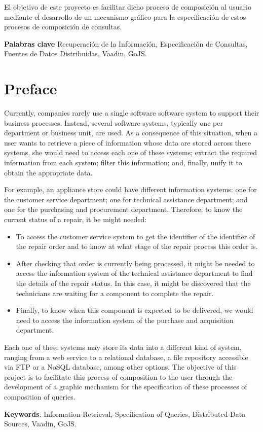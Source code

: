 	
El objetivo de este proyecto es facilitar dicho proceso de composición al usuario mediante el desarrollo de un mecanismo gráfico para la especificación de estos procesos de composición de consultas.

	
 \textbf{Palabras clave}
 Recuperación de la Información, Especificación de Consultas, Fuentes de Datos Distribuidas, Vaadin, GoJS.
	
\chapter*{Preface}

Currently, companies rarely use a single software software system to support their business processes. Instead, several software systems, typically one per department or business unit, are used.  As a consequence of this situation, when a user wants to retrieve a piece of information whose data are stored across these
systems, she would need to access each one of these systems; extract the required information from each system; filter this information; and, finally, unify it to obtain the appropriate data.
	
For example, an appliance store could have different information systems: one for the customer service department; one for technical assistance department; and one for the purchasing and procurement department. Therefore, to know the current status of a repair, it be might needed:

\begin{itemize}

    \item To access the customer service system to get the identifier of the identifier of the repair order and to know at what stage of the repair process this order is.
    \item After checking that order is currently being processed, it might be needed to access the information system of the technical assistance department to find the details of the repair status. In this case, it might be discovered that the technicians are waiting for a component to complete the repair.
	\item Finally, to know when this component is expected to be delivered, we would need to access the information system of the purchase and acquisition department.
	\end{itemize}

Each one of these systems may store its data into a different kind of system, ranging from a web service to a relational database, a file repository accessible via FTP or a NoSQL database, among other options. The objective of this project is to facilitate this process of composition to the user through the development of a graphic mechanism for the specification of these processes of composition of queries.
	

	\textbf{Keywords}:
	Information Retrieval, Specification of Queries, Distributed Data Sources, Vaadin, GoJS. 